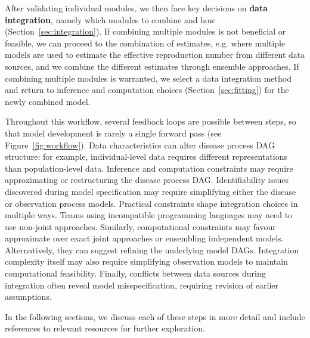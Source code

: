 \documentclass{article}
\begin{document}
After validating individual modules, we then face key decisions on \textbf{data integration}, namely which modules to combine and how  (Section~\ref{sec:integration}). If combining multiple modules is not beneficial or feasible, we can proceed to the combination of estimates, e.g. where multiple models are used to estimate the effective reproduction number from different data sources, and we combine the different estimates through ensemble approaches. If combining multiple modules is warranted, we select a data integration method and return to inference and computation choices (Section~\ref{sec:fitting}) for the newly combined model.

Throughout this workflow, several feedback loops are possible between steps, so that model development is rarely a single forward pass (see Figure~\ref{fig:workflow}). 
Data characteristics can alter disease process \ac{DAG} structure: for example, individual-level data requires different representations than population-level data. 
Inference and computation constraints may require approximating or restructuring the disease process \ac{DAG}.
Identifiability issues discovered during model specification may require simplifying either the disease or observation process models. 
Practical constraints shape integration choices in multiple ways. 
Teams using incompatible programming languages may need to use non-joint approaches. 
Similarly, computational constraints may favour approximate over exact joint approaches or ensembling independent models.
Alternatively, they can suggest refining the underlying model \ac{DAG}s.
Integration complexity itself may also require simplifying observation models to maintain computational feasibility. 
Finally, conflicts between data sources during integration often reveal model misspecification, requiring revision of earlier assumptions.

In the following sections, we discuss each of these steps in more detail and include references to relevant resources for further exploration.
\end{document}
